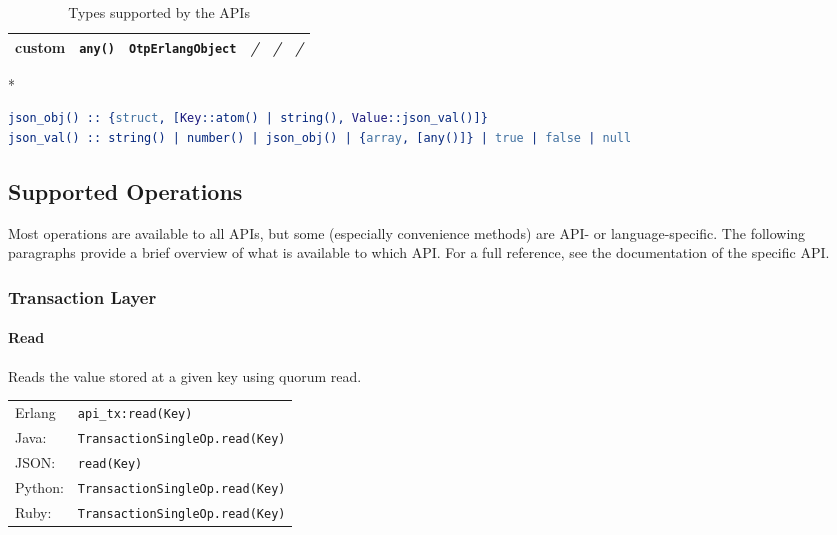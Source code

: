 \documentclass[a4paper]{scrreprt}
\newcommand{\code}[1]{\lstinline[basicstyle=\ttfamily]!#1!}
\begin{document}
\begin{table}
\begin{threeparttable}[b]
\begin{tabular}{llllll}
    custom     & \code{any()}      & \code{OtpErlangObject}       & \emph{/}                        & \emph{/}                  & \emph{/} \\
    \bottomrule
    \end{tabular}
    \begin{tablenotes}
      \item[*] ~\vspace{-1.5em}%
\begin{lstlisting}[language=erlang]
json_obj() :: {struct, [Key::atom() | string(), Value::json_val()]}
json_val() :: string() | number() | json_obj() | {array, [any()]} | true | false | null
\end{lstlisting}
    \end{tablenotes}
    \caption{Types supported by the \scalaris{} APIs}
    \label{api.supported_types}
  \end{threeparttable}
\end{table}

\subsection{Supported Operations}
\label{sec:apis.ops}

Most operations are available to all APIs, but some (especially convenience
methods) are API- or language-specific. The following paragraphs
provide a brief overview of what is available to which API. For a full
reference, see the documentation of the specific API.

\subsubsection{Transaction Layer}

\paragraph{Read}
Reads the value stored at a given key using quorum read.

\begin{tabular}{lp{14cm}}
Erlang  & \code{api_tx:read(Key)}\\
Java:   & \code{TransactionSingleOp.read(Key)}\\
JSON:   & \code{read(Key)}\\
Python: & \code{TransactionSingleOp.read(Key)}\\
Ruby:   & \code{TransactionSingleOp.read(Key)}
\end{tabular}
\end{document}
